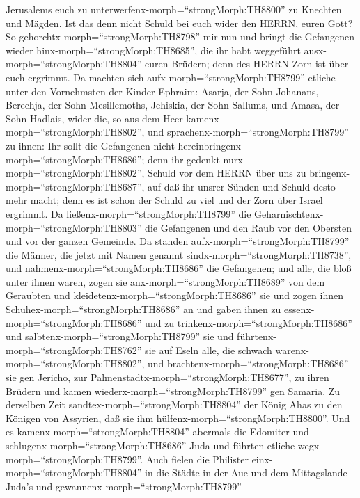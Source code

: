Jerusalems euch zu unterwerfenx-morph=``strongMorph:TH8800'' zu Knechten
und Mägden. Ist das denn nicht Schuld bei euch wider den HERRN, euren
Gott?  So gehorchtx-morph=``strongMorph:TH8798'' mir nun
und bringt die Gefangenen wieder hinx-morph=``strongMorph:TH8685'', die
ihr habt weggeführt ausx-morph=``strongMorph:TH8804'' euren Brüdern;
denn des HERRN Zorn ist über euch ergrimmt.  Da machten
sich aufx-morph=``strongMorph:TH8799'' etliche unter den Vornehmsten der
Kinder Ephraim: Asarja, der Sohn Johanans, Berechja, der Sohn
Mesillemoths, Jehiskia, der Sohn Sallums, und Amasa, der Sohn Hadlais,
wider die, so aus dem Heer kamenx-morph=``strongMorph:TH8802'',
 und sprachenx-morph=``strongMorph:TH8799'' zu ihnen: Ihr
sollt die Gefangenen nicht hereinbringenx-morph=``strongMorph:TH8686'';
denn ihr gedenkt nurx-morph=``strongMorph:TH8802'', Schuld vor dem HERRN
über uns zu bringenx-morph=``strongMorph:TH8687'', auf daß ihr unsrer
Sünden und Schuld desto mehr macht; denn es ist schon der Schuld zu viel
und der Zorn über Israel ergrimmt.  Da
ließenx-morph=``strongMorph:TH8799'' die
Geharnischtenx-morph=``strongMorph:TH8803'' die Gefangenen und den Raub
vor den Obersten und vor der ganzen Gemeinde.  Da standen
aufx-morph=``strongMorph:TH8799'' die Männer, die jetzt mit Namen
genannt sindx-morph=``strongMorph:TH8738'', und
nahmenx-morph=``strongMorph:TH8686'' die Gefangenen; und alle, die bloß
unter ihnen waren, zogen sie anx-morph=``strongMorph:TH8689'' von dem
Geraubten und kleidetenx-morph=``strongMorph:TH8686'' sie und zogen
ihnen Schuhex-morph=``strongMorph:TH8686'' an und gaben ihnen zu
essenx-morph=``strongMorph:TH8686'' und zu
trinkenx-morph=``strongMorph:TH8686'' und
salbtenx-morph=``strongMorph:TH8799'' sie und
führtenx-morph=``strongMorph:TH8762'' sie auf Eseln alle, die schwach
warenx-morph=``strongMorph:TH8802'', und
brachtenx-morph=``strongMorph:TH8686'' sie gen Jericho, zur
Palmenstadtx-morph=``strongMorph:TH8677'', zu ihren Brüdern und kamen
wiederx-morph=``strongMorph:TH8799'' gen Samaria.  Zu
derselben Zeit sandtex-morph=``strongMorph:TH8804'' der König Ahas zu
den Königen von Assyrien, daß sie ihm
hülfenx-morph=``strongMorph:TH8800''.  Und es
kamenx-morph=``strongMorph:TH8804'' abermals die Edomiter und
schlugenx-morph=``strongMorph:TH8686'' Juda und führten etliche
wegx-morph=``strongMorph:TH8799''.  Auch fielen die
Philister einx-morph=``strongMorph:TH8804'' in die Städte in der Aue und
dem Mittagslande Juda's und gewannenx-morph=``strongMorph:TH8799''
